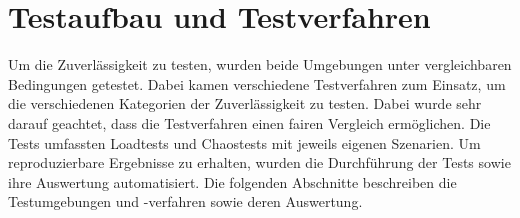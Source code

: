 \section{Testaufbau und Testverfahren}
Um die Zuverlässigkeit zu testen, wurden beide Umgebungen unter vergleichbaren Bedingungen getestet. 
Dabei kamen verschiedene Testverfahren zum Einsatz, um die verschiedenen Kategorien der Zuverlässigkeit zu testen.
Dabei wurde sehr darauf geachtet, dass die Testverfahren einen fairen Vergleich ermöglichen.
Die Tests umfassten Loadtests und Chaostests mit jeweils eigenen Szenarien. 
Um reproduzierbare Ergebnisse zu erhalten, wurden die Durchführung der Tests sowie ihre Auswertung automatisiert.
Die folgenden Abschnitte beschreiben die Testumgebungen und -verfahren sowie deren Auswertung.




